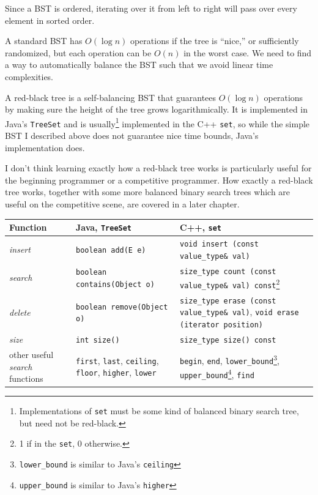 Since a BST is ordered, iterating over it from left to right will pass over every element in sorted order.

A standard BST has $O(\log{n})$ operations if the tree is ``nice,'' or sufficiently randomized, but each operation can be $O(n)$ in the worst case. We need to find a way to automatically balance the BST such that we avoid linear time complexities.

A red-black tree is a self-balancing BST that guarantees $O(\log{n})$ operations by making sure the height of the tree grows logarithmically. It is implemented in Java's \texttt{TreeSet} and is usually\footnote{Implementations of \texttt{set} must be some kind of balanced binary search tree, but need not be red-black.} implemented in the C++ \texttt{set}, so while the simple BST I described above does not guarantee nice time bounds, Java's implementation does.

I don't think learning exactly how a red-black tree works is particularly useful for the beginning programmer or a competitive programmer. How exactly a red-black tree works, together with some more balanced binary search trees which are useful on the competitive scene, are covered in a later chapter.

\begin{center}\begin{tabular}{ | p{5cm} | p{5cm} | p{5cm} | }
      \hline
      \textbf{Function}	&	\textbf{Java, \texttt{TreeSet}}	&	\textbf{C++, \texttt{set}} \\ \hline
      \textit{insert}		&	\texttt{boolean add(E e)}	&	\texttt{void insert (const value\_type\& val)} \\ \hline
      \textit{search}		&	\texttt{boolean contains(Object o)}	&	\texttt{size\_type count (const value\_type\& val) const}\footnote{1 if in the \texttt{set}, 0 otherwise.}	\\ \hline
      \textit{delete}		&	\texttt{boolean	remove(Object o)}		&	\texttt{size\_type erase (const value\_type\& val)}, \texttt{void erase (iterator position)} \\ \hline
      \textit{size} & \texttt{int size()} & \texttt{size\_type size() const} \\ \hline
      other useful \textit{search} functions	& \texttt{first}, \texttt{last}, \texttt{ceiling}, \texttt{floor}, \texttt{higher}, \texttt{lower} & \texttt{begin}, \texttt{end}, \texttt{lower\_bound}\footnote{\texttt{lower\_bound} is similar to Java's \texttt{ceiling}}, \texttt{upper\_bound}\footnote{\texttt{upper\_bound} is similar to Java's \texttt{higher}}, \texttt{find} \\ \hline
\end{tabular}\end{center}


